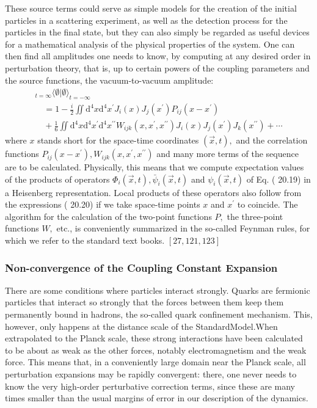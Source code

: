 \documentclass[main.tex]{subfiles}
\begin{document}
These source terms could serve as simple models for the creation of the initial particles in a scattering experiment, as well as the detection process for the particles in the final state, but they can also simply be regarded as useful devices for a mathematical analysis of the physical properties of the system. One can then find all amplitudes one needs to know, by computing at any desired order in perturbation theory, that is, up to certain powers of the coupling parameters and the source functions, the vacuum-to-vacuum amplitude:
$$
\begin{array}{l}
{_{t=\infty}\langle\emptyset | \emptyset\rangle_{t=-\infty}} \\
{\quad=1-\frac{i}{2} \iint \mathrm{d}^{4} x \mathrm{d}^{4} x^{\prime} J_{i}(x) J_{j}\left(x^{\prime}\right) P_{i j}\left(x-x^{\prime}\right)} \\
{\quad+\frac{1}{6} \iint \mathrm{d}^{4} x \mathrm{d}^{4} x^{\prime} \mathrm{d}^{4} x^{\prime \prime} W_{i j k}\left(x, x^{\prime}, x^{\prime \prime}\right) J_{i}(x) J_{j}\left(x^{\prime}\right) J_{k}\left(x^{\prime \prime}\right)+\cdots}
\end{array}
$$
where $x$ stands short for the space-time coordinates $(\vec{x}, t),$ and the correlation functions $P_{i j}\left(x-x^{\prime}\right), W_{i j k}\left(x, x^{\prime}, x^{\prime \prime}\right)$ and many more terms of the sequence are to be calculated. Physically, this means that we compute expectation values of the products of operators $\Phi_{i}(\vec{x}, t), \bar{\psi}_{i}(\vec{x}, t)$ and $\psi_{i}(\vec{x}, t)$ of Eq. ( 20.19) in a Heisenberg representation. Local products of these operators also follow from the expressions ( 20.20)
if we take space-time points $x$ and $x^{\prime}$ to coincide. The algorithm for the calculation of the two-point functions $P,$ the three-point functions $W,$ etc., is conveniently summarized in the so-called Feynman rules, for which we refer to the standard text books. $[27,121,123]$


\subsubsection{Non-convergence of the Coupling Constant Expansion}\label{ch20.4.1}

There are some conditions where particles interact strongly. Quarks are fermionic particles that interact so strongly that the forces between them keep them permanently bound in hadrons, the so-called quark confinement mechanism. This, however, only happens at the distance scale of the StandardModel.When extrapolated to the Planck scale, these strong interactions have been calculated to be about as weak as the other forces, notably electromagnetism and the weak force. This means that, in a conveniently large domain near the Planck scale, all perturbation expansions may be rapidly convergent: there, one never needs to know the very high-order perturbative correction terms, since these are many times smaller than the usual margins of error in our description of the dynamics.
\end{document}
